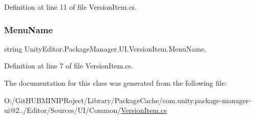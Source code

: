 Definition at line 11 of file Version\+Item.\+cs.

\mbox{\label{class_unity_editor_1_1_package_manager_1_1_u_i_1_1_version_item_ae07b13c5b5c642e61f1d06c2370d0158}} 
\subsubsection{\texorpdfstring{MenuName}{MenuName}}
{\footnotesize\ttfamily string Unity\+Editor.\+Package\+Manager.\+U\+I.\+Version\+Item.\+Menu\+Name\hspace{0.3cm}{\ttfamily [get]}, {\ttfamily [set]}}



Definition at line 7 of file Version\+Item.\+cs.



The documentation for this class was generated from the following file\+:\begin{DoxyCompactItemize}
\item 
O\+:/\+Git\+H\+U\+B\+M\+I\+N\+I\+P\+Roject/\+Library/\+Package\+Cache/com.\+unity.\+package-\/manager-\/ui@2../\+Editor/\+Sources/\+U\+I/\+Common/\mbox{\hyperlink{_version_item_8cs}{Version\+Item.\+cs}}\end{DoxyCompactItemize}
